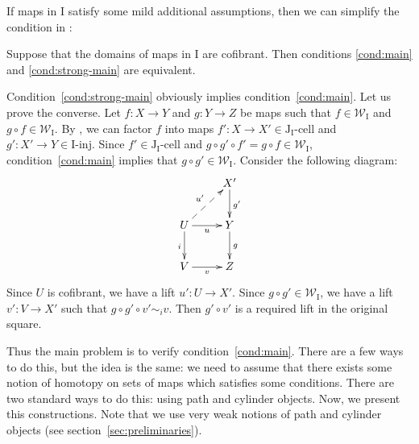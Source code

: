 \documentclass{tac}
\theoremstyle{definition}
\newcommand{\we}{\mathcal{W}}
\newcommand{\I}{\mathrm{I}}
\newcommand{\J}{\mathrm{J}}
\newcommand{\class}[2]{#1\text{-}\mathrm{#2}}
\newcommand{\Iinj}[1][\I]{\class{#1}{inj}}
\newcommand{\Icell}[1][\I]{\class{#1}{cell}}
\newcommand{\Jcell}[1][]{\Icell[\J#1]}
\begin{document}
If maps in $\I$ satisfy some mild additional assumptions, then we can simplify the condition in :
\begin{prop}[main]
Suppose that the domains of maps in $\I$ are cofibrant.
Then conditions \eqref{cond:main} and \eqref{cond:strong-main} are equivalent.
\end{prop}
\proof
Condition~\eqref{cond:strong-main} obviously implies condition~\eqref{cond:main}.
Let us prove the converse.
Let $f : X \to Y$ and $g : Y \to Z$ be maps such that $f \in \we_\I$ and $g \circ f \in \we_\I$.
By , we can factor $f$ into maps $f' : X \to X' \in \Jcell[_\I]$ and $g' : X' \to Y \in \Iinj$.
Since $f' \in \Jcell[_\I]$ and $g \circ g' \circ f' = g \circ f \in \we_\I$, condition~\eqref{cond:main} implies that $g \circ g' \in \we_\I$.
Consider the following diagram:
\[ \xymatrix{ & X' \ar[d]^{g'} \\
              U \ar[r]_u \ar[d]_i \ar@{-->}[ur]^{u'} & Y \ar[d]^g \\
              V \ar[r]_v & Z
            } \]
Since $U$ is cofibrant, we have a lift $u' : U \to X'$.
Since $g \circ g' \in \we_\I$, we have a lift $v' : V \to X'$ such that $g \circ g' \circ v' \sim_i v$.
Then $g' \circ v'$ is a required lift in the original square.
\endproof

Thus the main problem is to verify condition~\eqref{cond:main}.
There are a few ways to do this, but the idea is the same:
we need to assume that there exists some notion of homotopy on sets of maps which satisfies some conditions.
There are two standard ways to do this: using path and cylinder objects.
Now, we present this constructions.
Note that we use very weak notions of path and cylinder objects (see section~\ref{sec:preliminaries}).
\end{document}
